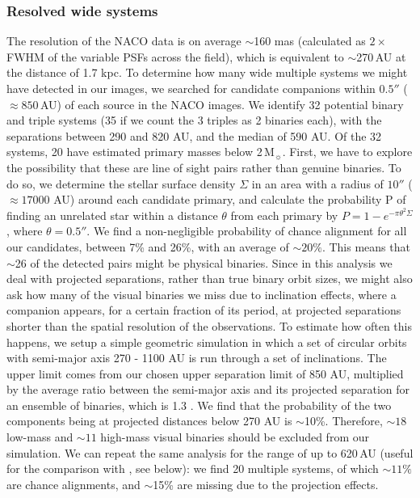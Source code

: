 \documentclass[a4paper,fleqn,usenatbib]{mnras}
\begin{document}
\subsubsection{Resolved wide systems}
\label{widesystems}
The resolution of the NACO data is on average $\sim$160 mas (calculated as $2\times$FWHM of the variable PSFs across the field), which is 
equivalent to $\sim$270\,AU at the distance of 1.7 kpc. 
To determine how many wide multiple systems we might have detected in our images, we searched for candidate companions within
$0.5''$ ($\approx 850\,$AU) of each source in the NACO images. We identify 32 potential binary and triple systems (35 if we count the 3 triples as 2 binaries each), 
with the separations between 
290 and 820 AU, and the median of 590 AU. Of the 32 systems, 20 have estimated primary masses below 2\,M$_{\sun}$. First, we have to explore the possibility that these are line of sight pairs rather than genuine binaries.
To do so, we determine the stellar surface density $\Sigma$ in an area with a radius of $10''$ ($\approx17000$ AU) around each candidate primary, 
and calculate the probability P of finding an unrelated star within a distance $\theta$ from each primary by $P=1-e^{-\pi \theta^2 \Sigma}$
\citep{correia06,reipurth07}, where $\theta=0.5''$. We find a non-negligible probability of chance alignment for all our
candidates, between 7\% and 26\%, with an average of $\sim 20\%$. This means that $\sim$26 of the detected pairs might be physical binaries. 
Since in this analysis we deal with projected separations, rather than true binary orbit sizes, we might also ask how many
of the visual binaries we miss due to inclination effects, where a companion  
 appears, for a certain fraction of its period, at projected separations shorter than the spatial resolution of the observations. 
To estimate how often this happens, we setup a simple geometric simulation in which a set of circular orbits
with semi-major axis 270 - 1100 AU is run through a set of inclinations. The upper limit comes from our chosen upper separation limit of 850 AU, multiplied by  
the average ratio between the semi-major axis and its projected separation for an ensemble of binaries, which is 1.3 \citep{kuiper35}. 
We find that the probability of the two components being at projected distances below 270 AU is $\sim$10\%. Therefore, $\sim18$ low-mass and $\sim11$ high-mass 
visual binaries should be excluded from
our simulation.
We can repeat the same analysis for the range of up to 620\,AU (useful for the comparison with \citealt{king12b}, see below): we find 
20 multiple systems, of which $\sim 11\%$ are chance alignments, and $\sim$15\% are missing due to the projection effects.
\end{document}
